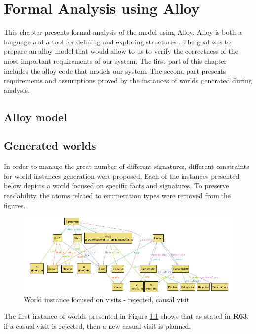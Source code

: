 \chapter{Formal Analysis using Alloy}
This chapter presents formal analysis of the model using Alloy. Alloy is both a language and a tool for defining and exploring structures \cite{alloy}. The goal was to prepare an alloy model that would allow to us to verify the correctness of the most important requirements of our system. The first part of this chapter includes the alloy code that models our system. The second part presents requirements and assumptions proved by the instances of worlds generated during analysis. 

\section{Alloy model}


\section{Generated worlds}


In order to manage the great number of different signatures, different constraints for world instances generation were proposed. Each of the instances presented below depicts a world focused on specific facts and signatures. To preserve readability, the atoms related to enumeration types were removed from the figures.

\begin{figure}[H]
    \centering
    \includegraphics[width=\textwidth, keepaspectratio, origin=c]{alloy/world_instances/showWorldWithRejectedCasualVisit2.png}
    \caption{World instance focused on visits - rejected, causal visit}
    \label{fig:rejected_causal}
\end{figure}

 The first instance of worlds presented in Figure \ref{fig:rejected_causal} shows that as stated in \textbf{R63}, if a casual visit is rejected, then a new casual visit is planned.
 
